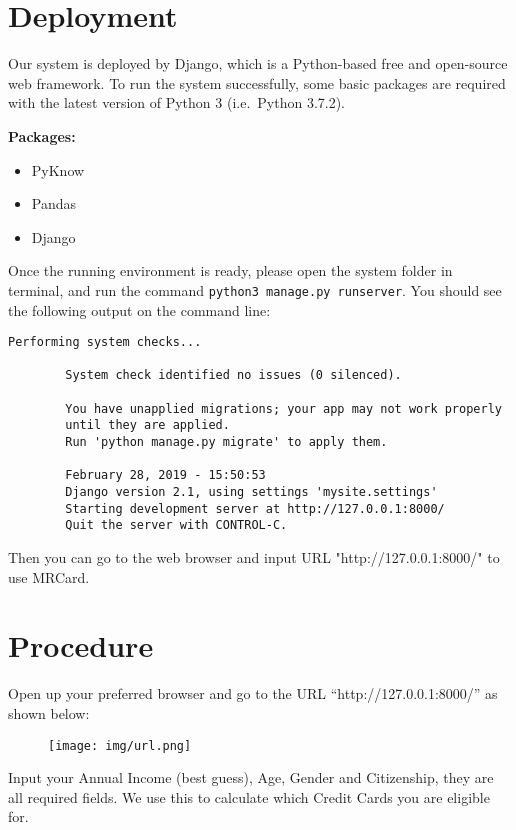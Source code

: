 \documentclass[12pt]{article}
\begin{document}
	\section{Deployment}
	Our system is deployed by Django, which is a Python-based free and open-source web framework. To run the system successfully, some basic packages are required with the latest version of Python 3 (i.e.\ Python 3.7.2).

	\textbf{Packages:}
	\begin{itemize}
		\item PyKnow
		\item Pandas
		\item Django
	\end{itemize}

	Once the running environment is ready, please open the system folder in terminal, and run the command \verb|python3 manage.py runserver|. You should see the following output on the command line:

	\begin{lstlisting}[style=DOS, frame=single, gobble=7, tabsize=4, showstringspaces=false]
		Performing system checks...

		System check identified no issues (0 silenced).

		You have unapplied migrations; your app may not work properly
		until they are applied.
		Run 'python manage.py migrate' to apply them.

		February 28, 2019 - 15:50:53
		Django version 2.1, using settings 'mysite.settings'
		Starting development server at http://127.0.0.1:8000/
		Quit the server with CONTROL-C.
	\end{lstlisting}

	Then you can go to the web browser and input URL "http://127.0.0.1:8000/" to use MRCard.


	\section{Procedure} %
	\label{ssub:start}
		Open up your preferred browser and go to the URL “http://127.0.0.1:8000/” as shown below:

		\begin{figure}[H]
			\centering
			\texttt{[image: img/url.png]}
		\end{figure}

		Input your Annual Income (best guess), Age, Gender and Citizenship, they are all required fields. We use this to calculate which Credit Cards you are eligible for.
\end{document}
